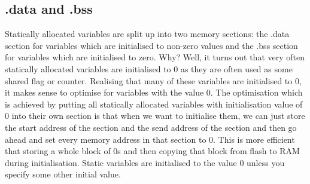 \subsection{.data and .bss}
Statically allocated variables are split up into two memory sections: the .data section for variables which are initialised to non-zero values and the .bss section for variables which are initialised to zero.
Why? Well, it turns out that very often statically allocated variables are initialised to 0 as they are often used as some shared flag or counter. 
Realising that many of these variables are initialised to 0, it makes sense to optimise for variables with the value 0.
The optimisation which is achieved by putting all statically allocated variables with initialisation value of 0 into their own section is that when we want to initialise them, we can just store the start address of the section and the send address of the section and then go ahead and set every memory address in that section to 0.
This is more efficient that storing a whole block of 0s and then copying that block from flash to RAM during initialisation. 
Static variables are initialised to the value 0 unless you specify some other initial value.

